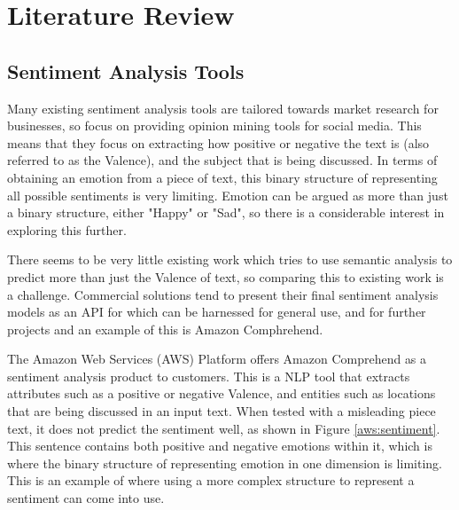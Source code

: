 
\section{Literature Review}
\subsection{Sentiment Analysis Tools}

Many existing sentiment analysis tools are tailored towards market research for businesses, so focus on providing opinion mining tools for social media. This means that they focus on extracting how positive or negative the text is (also referred to as the Valence), and the subject that is being discussed. In terms of obtaining an emotion from a piece of text, this binary structure of representing all possible sentiments is very limiting. Emotion can be argued as more than just a binary structure, either "Happy" or "Sad", so there is a considerable interest in exploring this further.

There seems to be very little existing work which tries to use semantic analysis to predict more than just the Valence of text, so comparing this to existing work is a challenge. Commercial solutions tend to present their final sentiment analysis models as an API for which can be harnessed for general use, and for further projects and an example of this is Amazon Comphrehend.

The Amazon Web Services (AWS) Platform offers Amazon Comprehend \cite{aws} as a sentiment analysis product to customers. This is a NLP tool that extracts attributes such as a positive or negative Valence, and entities such as locations that are being discussed in an input text. When tested with a misleading piece text, it does not predict the sentiment well, as shown in Figure \ref{aws:sentiment}. This sentence contains both positive and negative emotions within it, which is where the binary structure of representing emotion in one dimension is limiting. This is an example of where using a more complex structure to represent a sentiment can come into use. 

